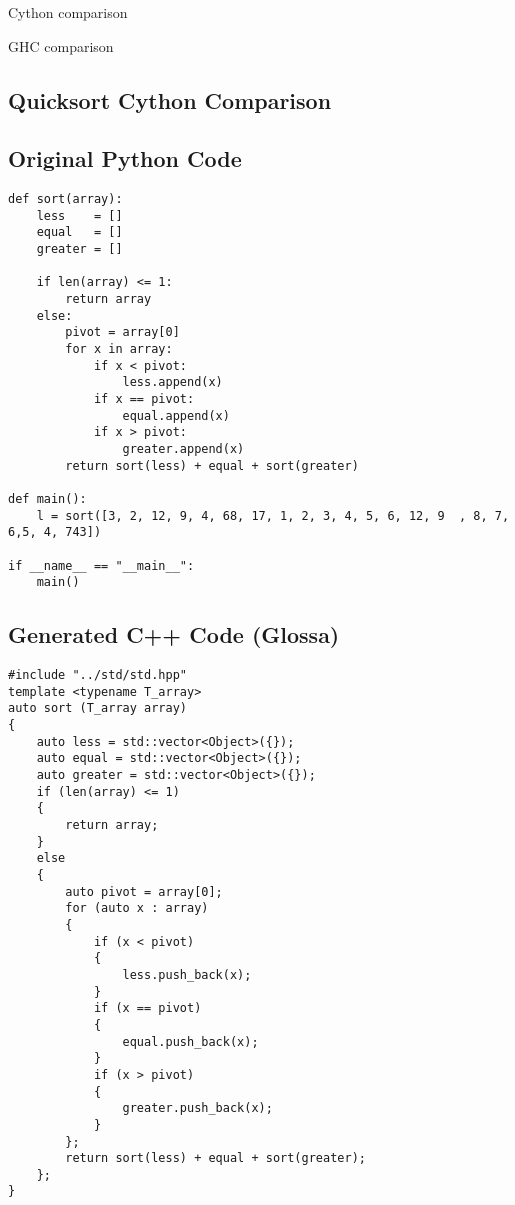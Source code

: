 \documentclass{article}
\begin{document}
Cython comparison

GHC comparison

\subsection{Quicksort Cython Comparison}

\newpage
\subsection{Original Python Code}

\lstset{language=Python}
\begin{lstlisting}
def sort(array):
    less    = []
    equal   = []
    greater = []

    if len(array) <= 1:
        return array
    else:
        pivot = array[0]
        for x in array:
            if x < pivot:
                less.append(x)
            if x == pivot:
                equal.append(x)
            if x > pivot:
                greater.append(x)
        return sort(less) + equal + sort(greater)

def main():
    l = sort([3, 2, 12, 9, 4, 68, 17, 1, 2, 3, 4, 5, 6, 12, 9  , 8, 7, 6,5, 4, 743])

if __name__ == "__main__":
    main()
\end{lstlisting}

\lstset{language=C}

\newpage
\subsection{Generated C++ Code (Glossa)}

\begin{lstlisting}
#include "../std/std.hpp"
template <typename T_array>
auto sort (T_array array)
{
    auto less = std::vector<Object>({});
    auto equal = std::vector<Object>({});
    auto greater = std::vector<Object>({});
    if (len(array) <= 1)
    {
        return array;
    }
    else
    {
        auto pivot = array[0];
        for (auto x : array)
        {
            if (x < pivot)
            {
                less.push_back(x);
            }
            if (x == pivot)
            {
                equal.push_back(x);
            }
            if (x > pivot)
            {
                greater.push_back(x);
            }
        };
        return sort(less) + equal + sort(greater);
    };
}
\end{lstlisting}
\end{document}

